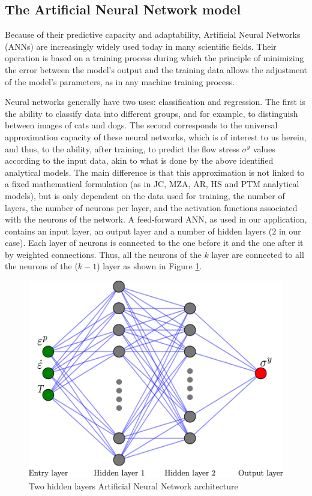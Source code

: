\documentclass[metals,article,submit,pdftex,moreauthors]{Definitions/mdpi}
\begin{document}
\subsection{The Artificial Neural Network model\label{sec:ANNmodel}}

Because of their predictive capacity and adaptability, Artificial Neural Networks (ANNs) are increasingly widely used today in many scientific fields.
Their operation is based on a training process during which the principle of minimizing the error between the model's output and the training data allows the adjustment of the model's parameters, as in any machine training process.

Neural networks generally have two uses: classification and regression.
The first is the ability to classify data into different groups, and for example, to distinguish between images of cats and dogs.
The second corresponds to the universal approximation capacity of these neural networks, which is of interest to us herein, and thus, to the ability, after training, to predict the flow stress $\sigma^y$ values according to the input data, akin to what is done by the above identified analytical models.
The main difference is that this approximation is not linked to a fixed mathematical formulation (as in JC, MZA, AR, HS and PTM analytical models), but is only dependent on the data used for training, the number of layers, the number of neurons per layer, and the activation functions associated with the neurons of the network.
A feed-forward ANN, as used in our application, contains an input layer, an output layer and a number of hidden layers ($2$ in our case).
Each layer of neurons is connected to the one before it and the one after it by weighted connections.
Thus, all the neurons of the $k$ layer are connected to all the neurons of the ($k-1$) layer as shown in Figure \ref{fig:ANN-2HL}.
\begin{figure}[!ht]
\centering
\includegraphics[width=0.7\columnwidth]
{Figures/ANN-scheme-2HL}
\caption{Two hidden layers Artificial Neural Network architecture}
\label{fig:ANN-2HL}
\end{figure}
\end{document}
